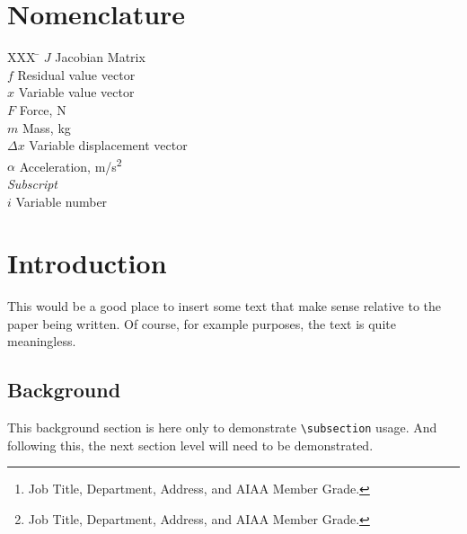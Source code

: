\documentclass[]{aiaa-tc} %
\author{
  First A. Author%
    \thanks{Job Title, Department, Address, and AIAA Member Grade.}
  \ and Second B. Author\thanksibid{1}\\
  {\normalsize\itshape
   Business or Academic Affiliation, City, Province, Zipcode, Country}\\
  \and
  Third C. Author%
   \thanks{Job Title, Department, Address, and AIAA Member Grade.}\\
  {\normalsize\itshape
  Business or Academic Affliation, City, Province, Zipcode, Country}
 }
\begin{document}
\maketitle

\begin{abstract}
This is a bare-bones \LaTeX{} template of an AIAA technical conference paper.
It is intended to demonstrate the bare minimum set of \LaTeX{} commands
to produce an AIAA technical conference paper.
To explore more \LaTeX{} capabilities, see the advanced template.
For detailed AIAA layout and style guidelines, please refer to the AIAA
author guide for paper submission, format, and other procedures.
\end{abstract}

\section*{Nomenclature}

\begin{tabbing}
  XXX \= \kill%
  $J$ \> Jacobian Matrix \\
  $f$ \> Residual value vector \\
  $x$ \> Variable value vector \\
  $F$ \> Force, N \\
  $m$ \> Mass, kg \\
  $\Delta x$ \> Variable displacement vector \\
  $\alpha$ \> Acceleration, m/s\textsuperscript{2} \\[5pt]
  \textit{Subscript}\\
  $i$ \> Variable number \\
 \end{tabbing}

\section{Introduction}

This would be a good place to insert some text that make sense relative
to the paper being written.
Of course, for example purposes, the text is quite meaningless.

\subsection{Background}

This background section is here only to demonstrate \verb|\subsection|
usage.
And following this, the next section level will need to be demonstrated.
\end{document}

